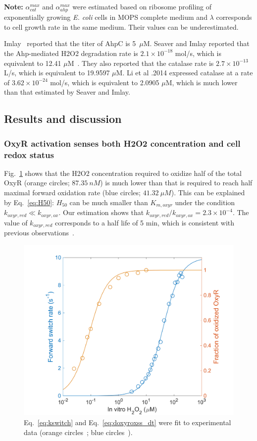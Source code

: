 \documentclass[10pt]{article}
\begin{document}
\noindent\textbf{Note:} $\alpha_{cat}^{max}$ and $\alpha_{ahp}^{max}$ were estimated based on ribosome profiling of exponentially growing \textit{E. coli} cells in MOPS complete medium and $\lambda$ corresponds to cell growth rate in the same medium. Their values can be underestimated.

Imlay~\cite{imlay2013molecular} reported that the titer of AhpC is 5~$\mu$M. Seaver and Imlay reported that the Ahp-mediated H2O2 degradation rate is $2.1\times 10^{-18}$ mol/s, which is equivalent to 12.41 $\mu$M~\cite{seaver2001hydrogen}. They also reported that the catalase rate is $2.7\times 10^{-13}$ L/s, which is equivalent to 19.9597 $\mu$M. Li et al .2014 expressed catalase at a rate of $3.62 \times 10^{-24}$ mol/s, which is equivalent to 2.0905 $\mu$M, which is much lower than that estimated by Seaver and Imlay.

\subsection{Results and discussion}

\subsubsection{OxyR activation senses both H2O2 concentration and cell redox status}
\label{sect:oxyr_activation_senses_both_h2o2_concentration_and_cell_redox_status}
Fig.~\ref{fig:fit_oxyr_paras} shows that the H2O2 concentration required to oxidize half of the total OxyR (orange circles; $87.35~nM$) is much lower than that is required to reach half maximal forward oxidation rate (blue circles; $41.32~\mu M$). This can be explained by Eq.~\ref{eq:H50}: $H_{50}$ can be much smaller than $K_{m,oxyr}$ under the condition $k_{oxyr,red}\ll k_{oxyr,ox}$. Our estimation shows that $k_{oxyr,red}/k_{oxyr,ox} = 2.3\times 10^{-4}$. The value of $k_{oxyr,red}$ corresponds to a half life of 5 min, which is consistent with previous observations~\cite{aaslund1999regulation}.

\begin{figure}[H]
\centering
  \includegraphics[width=0.5\linewidth]{prediction_oxyr_kinetics_fraction.png}
  \caption{Eq.~\ref{eq:kswitch} and Eq.~\ref{eq:doxyroxss_dt} were fit to experimental data (orange circles~\cite{aaslund1999regulation}; blue circles~\cite{lee2004redox}).}
  \label{fig:fit_oxyr_paras}
\end{figure}
\end{document}
